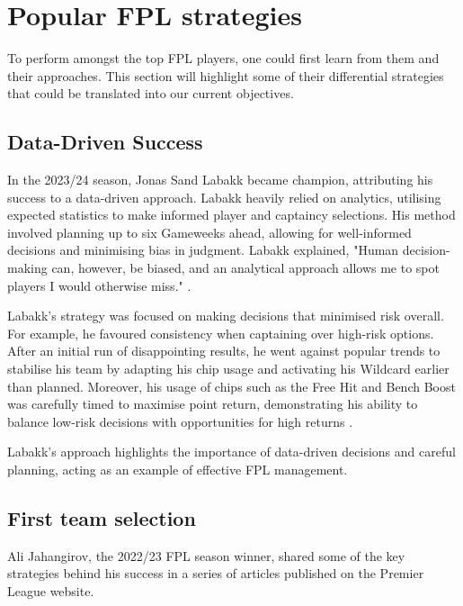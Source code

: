 
\section{Popular FPL strategies}

To perform amongst the top FPL players, one could first learn from them and their approaches. This section will highlight some of their differential strategies that could be translated into our current objectives.

\subsection{Data-Driven Success}

In the 2023/24 season, Jonas Sand Labakk became champion, attributing his success to a data-driven approach. Labakk heavily relied on analytics, utilising expected statistics to make informed player and captaincy selections. His method involved planning up to six Gameweeks ahead, allowing for well-informed decisions and minimising bias in judgment. Labakk explained, "Human decision-making can, however, be biased, and an analytical approach allows me to spot players I would otherwise miss." \cite{fantasyfootballhub_labakk_2024}.

Labakk's strategy was focused on making decisions that minimised risk overall. For example, he favoured consistency when captaining over high-risk options. After an initial run of disappointing results, he went against popular trends to stabilise his team by adapting his chip usage and activating his Wildcard earlier than planned. Moreover, his usage of chips such as the Free Hit and Bench Boost was carefully timed to maximise point return, demonstrating his ability to balance low-risk decisions with opportunities for high returns \cite{premierleague_labakk_2024}.

Labakk's approach highlights the importance of data-driven decisions and careful planning, acting as an example of effective FPL management.

\subsection{First team selection}

Ali Jahangirov, the 2022/23 FPL season winner, shared some of the key strategies behind his success in a series of articles published on the Premier League website. 

